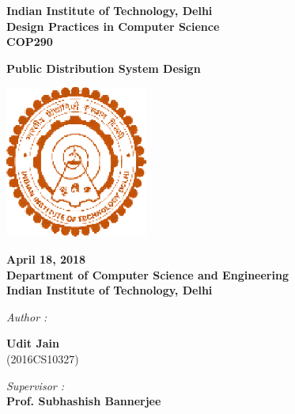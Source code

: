 \documentclass[12pt]{report}
\begin{document}
\begin{center}
\LARGE{\textbf{Indian Institute of Technology, Delhi}}\\
\vspace{0.8cm}
\large{\textbf{Design Practices in Computer Science}}\\[5pt]
\large{\textbf{COP290}}\\[5pt]

\vspace{0.5cm}

\large{\textbf{Public Distribution System Design}}

\begin{center}
\includegraphics[height=5cm]{iitd.eps}
\end{center}
\vspace{0.2cm}

\textbf{April 18, 2018} \\
\textbf{Department of Computer Science and Engineering} \\
\textbf{Indian Institute of Technology, Delhi}\\


\vspace{1.5cm}

  
\begin{multicols*}{2}

\begin{flushleft}

\textit{Author :\\ }


\textbf{Udit Jain} \\
(2016CS10327)\\

\end{flushleft}


\columnbreak

\begin{flushright}

\textit{Supervisor :\\ }
\textbf{Prof. Subhashish Bannerjee} \\[5pt]

\end{flushright}

\end{multicols*}

\end{center}
\end{document}
